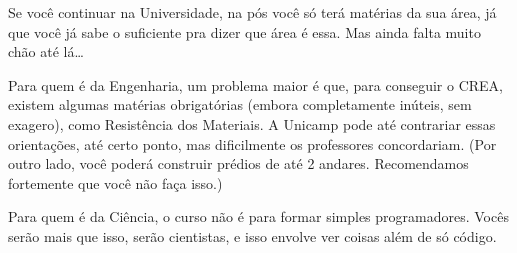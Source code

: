 Se você continuar na Universidade, na pós você só terá matérias da sua área, já
que você já sabe o suficiente pra dizer que área é essa. Mas ainda falta muito
chão até lá{\dots}

Para quem é da Engenharia, um problema maior é que, para conseguir o CREA,
existem algumas matérias obrigatórias (embora completamente inúteis, sem
exagero), como Resistência dos Materiais. A Unicamp pode até contrariar essas orientações, até
certo ponto, mas dificilmente os professores concordariam. (Por outro lado,
você poderá construir prédios de até 2 andares. Recomendamos fortemente que você
não faça isso.)

Para quem é da Ciência, o curso não é para formar simples programadores. Vocês serão
mais que isso, serão cientistas, e isso envolve ver coisas além de só código.

